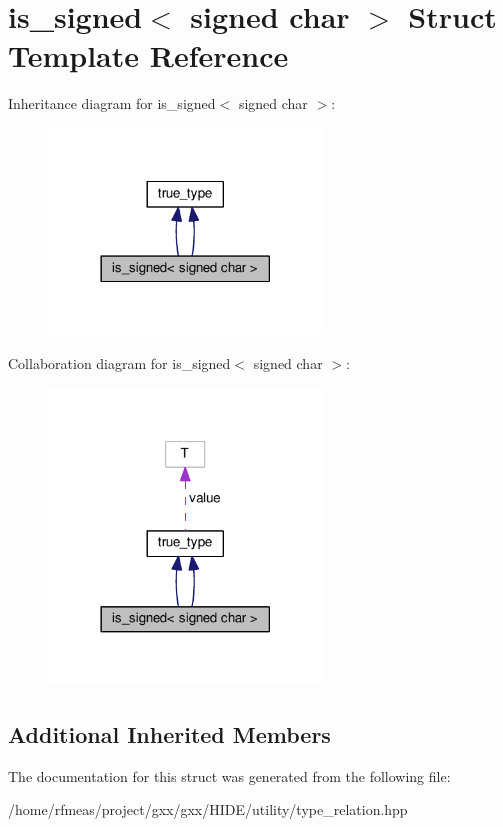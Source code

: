 \hypertarget{structis__signed_3_01signed_01char_01_4}{}\section{is\+\_\+signed$<$ signed char $>$ Struct Template Reference}
\label{structis__signed_3_01signed_01char_01_4}


Inheritance diagram for is\+\_\+signed$<$ signed char $>$\+:
\nopagebreak
\begin{figure}[H]
\begin{center}
\leavevmode
\includegraphics[width=206pt]{structis__signed_3_01signed_01char_01_4__inherit__graph}
\end{center}
\end{figure}


Collaboration diagram for is\+\_\+signed$<$ signed char $>$\+:
\nopagebreak
\begin{figure}[H]
\begin{center}
\leavevmode
\includegraphics[width=206pt]{structis__signed_3_01signed_01char_01_4__coll__graph}
\end{center}
\end{figure}
\subsection*{Additional Inherited Members}


The documentation for this struct was generated from the following file\+:\begin{DoxyCompactItemize}
\item 
/home/rfmeas/project/gxx/gxx/\+H\+I\+D\+E/utility/type\+\_\+relation.\+hpp\end{DoxyCompactItemize}
